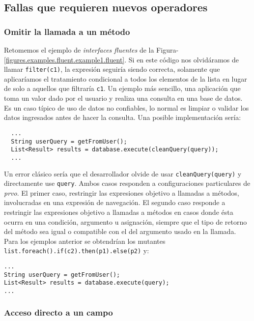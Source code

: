 \subsection{Fallas que requieren nuevos operadores}

\subsubsection{Omitir la llamada a un m\'etodo}

Retomemos el ejemplo de \emph{interfaces fluentes} de la Figura-\ref{figures.examples.fluent.example1.fluent}. Si en este c\'odigo nos olvid\'aramos de llamar \texttt{filter(c1)}, la expresi\'on seguir\'ia siendo correcta, solamente que aplicar\'iamos el tratamiento condicional a todos los elementos de la lista en lugar de solo a aquellos que filtrar\'ia \texttt{c1}. Un ejemplo m\'as sencillo, una aplicaci\'on que toma un valor dado por el usuario y realiza una consulta en una base de datos. Es un caso t\'ipico de uso de datos no confiables, lo normal es limpiar o validar los datos ingresados antes de hacer la consulta. Una posible implementaci\'on ser\'ia:
\begin{lstlisting}
  ...
  String userQuery = getFromUser();
  List<Result> results = database.execute(cleanQuery(query));
  ...
\end{lstlisting}
Un error cl\'asico ser\'ia que el desarrollador olvide de usar \texttt{cleanQuery(query)} y directamente use \texttt{query}. Ambos casos responden a configuraciones particulares de \emph{prvo}. El primer caso, restringir las expresiones objetivo a llamadas a m\'etodos, involucradas en una expresi\'on de navegaci\'on. El segundo caso responde a restringir las expresiones objetivo a llamadas a m\'etodos en casos donde \'esta ocurra en una condici\'on, argumento u asignaci\'on, siempre que el tipo de retorno del m\'etodo sea igual o compatible con el del argumento usado en la llamada. Para los ejemplos anterior se obtendr\'ian los mutantes \lstinline|list.foreach().if(c2).then(p1).else(p2)| y:
\begin{lstlisting}
...
String userQuery = getFromUser();
List<Result> results = database.execute(query);
...
\end{lstlisting}

\subsubsection{Acceso directo a un campo}

